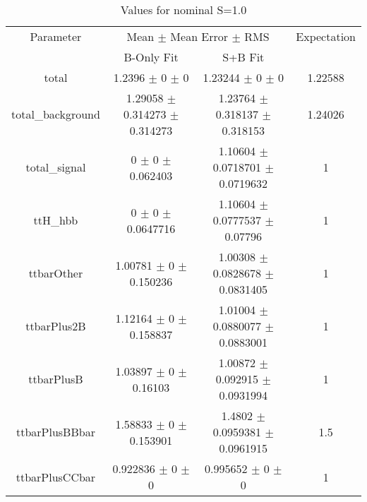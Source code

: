 \begin{table}
\centering
\caption{Values for nominal S=1.0}
\begin{tabular}{cccc}
\toprule
Parameter & \multicolumn{2}{c}{Mean $\pm$ Mean Error $\pm$ RMS} & Expectation\\
 & B-Only Fit & S+B Fit & \\
\midrule
total & \num{1.2396} $\pm$ \num{0} $\pm$ \num{0} & \num{1.23244} $\pm$ \num{0} $\pm$ \num{0} & \num{1.22588}\\
total\_background & \num{1.29058} $\pm$ \num{0.314273} $\pm$ \num{0.314273} & \num{1.23764} $\pm$ \num{0.318137} $\pm$ \num{0.318153} & \num{1.24026}\\
total\_signal & \num{0} $\pm$ \num{0} $\pm$ \num{0.062403} & \num{1.10604} $\pm$ \num{0.0718701} $\pm$ \num{0.0719632} & \num{1}\\
ttH\_hbb & \num{0} $\pm$ \num{0} $\pm$ \num{0.0647716} & \num{1.10604} $\pm$ \num{0.0777537} $\pm$ \num{0.07796} & \num{1}\\
ttbarOther & \num{1.00781} $\pm$ \num{0} $\pm$ \num{0.150236} & \num{1.00308} $\pm$ \num{0.0828678} $\pm$ \num{0.0831405} & \num{1}\\
ttbarPlus2B & \num{1.12164} $\pm$ \num{0} $\pm$ \num{0.158837} & \num{1.01004} $\pm$ \num{0.0880077} $\pm$ \num{0.0883001} & \num{1}\\
ttbarPlusB & \num{1.03897} $\pm$ \num{0} $\pm$ \num{0.16103} & \num{1.00872} $\pm$ \num{0.092915} $\pm$ \num{0.0931994} & \num{1}\\
ttbarPlusBBbar & \num{1.58833} $\pm$ \num{0} $\pm$ \num{0.153901} & \num{1.4802} $\pm$ \num{0.0959381} $\pm$ \num{0.0961915} & \num{1.5}\\
ttbarPlusCCbar & \num{0.922836} $\pm$ \num{0} $\pm$ \num{0} & \num{0.995652} $\pm$ \num{0} $\pm$ \num{0} & \num{1}\\
\bottomrule
\end{tabular}
\end{table}